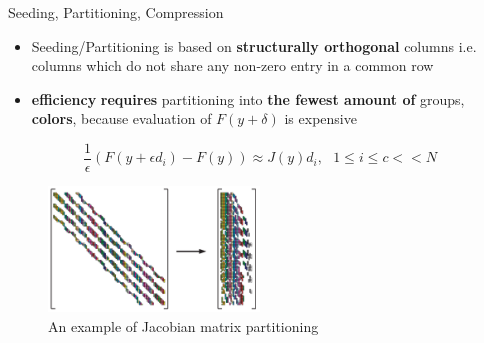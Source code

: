 \begin{frame}[t]{Seeding, Partitioning, Compression}
    \justifying
    \small
    
    \begin{itemize}
        \item Seeding/Partitioning is based on \textbf{structurally orthogonal} columns i.e. columns which do not share any non-zero entry in a common row
    
        \item \textbf{efficiency} \textbf{requires} partitioning into \textbf{the fewest amount of} groups, \textbf{colors}, because evaluation of $F(y + \delta)$ is expensive
    \end{itemize}

    \begin{equation}
	    \frac{1}{\epsilon} (F(y + \epsilon d_{i}) - F(y)) \approx J(y) d_{i}, \: \: \: 1 \leq i \leq c << N
    \end{equation}
    
    \begin{figure}[htpb]
    \centering
    \includegraphics[width=0.5\textwidth]{figures/matrix-compression.png}
    \caption{An example of Jacobian matrix partitioning     \cite{gebremedhin2005color}}
    \end{figure}

\end{frame}


